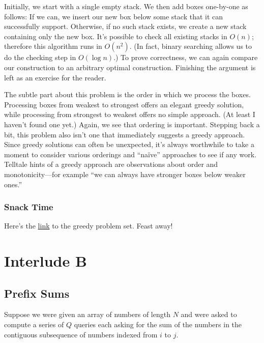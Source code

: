 Initially, we start with a single empty stack. We then add boxes one-by-one as follows: If we can, we insert our new box below some stack that it can successfully support. Otherwise, if no such stack exists, we create a new stack containing only the new box. It's possible to check all existing stacks in $O(n)$; therefore this algorithm runs in $O(n^2)$. (In fact, binary searching allows us to do the checking step in $O(\log n)$.) To prove correctness, we can again compare our construction to an arbitrary optimal construction. Finishing the argument is left as an exercise for the reader.

The subtle part about this problem is the order in which we process the boxes. Processing boxes from weakest to strongest offers an elegant greedy solution, while processing from strongest to weakest offers no simple approach. (At least I haven't found one yet.) Again, we see that ordering is important. Stepping back a bit, this problem also isn't one that immediately suggests a greedy approach. Since greedy solutions can often be unexpected, it's always worthwhile to take a moment to consider various orderings and ``na\"ive'' approaches to see if any work. Telltale hints of a greedy approach are observations about order and monotonicity---for example ``we can always have stronger boxes below weaker ones.''

\subsection{Snack Time}

Here's the \href{http://codeforces.com}{link} to the greedy problem set. Feast away!

\chapter*{Interlude B}

\section{Prefix Sums}

Suppose we were given an array of numbers of length $N$ and were asked to compute a series of $Q$ queries each asking for the sum of the numbers in the contiguous 
subsequence of numbers indexed from $i$ to $j$. 

